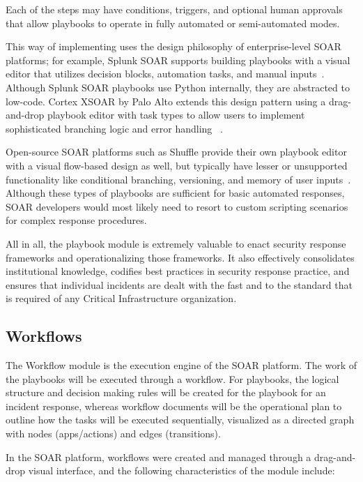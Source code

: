 Each of the steps may have conditions, triggers, and optional human approvals that allow playbooks to operate in fully automated or semi-automated modes.

This way of implementing uses the design philosophy of enterprise-level SOAR platforms; for example, Splunk SOAR supports building playbooks with a visual editor that utilizes decision blocks, automation tasks, and manual inputs~\cite{splunk}. Although Splunk SOAR playbooks use Python internally, they are abstracted to low-code. Cortex XSOAR by Palo Alto extends this design pattern using a drag-and-drop playbook editor with task types to allow users to implement sophisticated branching logic and error handling ~\cite{paloalto}.

Open-source SOAR platforms such as Shuffle provide their own playbook editor with a visual flow-based design as well, but typically have lesser or unsupported functionality like conditional branching, versioning, and memory of user inputs~\cite{techtarget}. Although these types of playbooks are sufficient for basic automated responses, SOAR developers would most likely need to resort to custom scripting scenarios for complex response procedures.

All in all, the playbook module is extremely valuable to enact security response frameworks and operationalizing those frameworks. It also effectively consolidates institutional knowledge, codifies best practices in security response practice, and ensures that individual incidents are dealt with the fast and to the standard that is required of any Critical Infrastructure organization.

\subsection{Workflows}

The Workflow module is the execution engine of the SOAR platform. The work of the playbooks will be executed through a workflow. For playbooks, the logical structure and decision making rules will be created for the playbook for an incident response, whereas workflow documents will be the operational plan to outline how the tasks will be executed sequentially, visualized as a directed graph with nodes (apps/actions) and edges (transitions).

In the SOAR platform, workflows were created and managed through a drag-and-drop visual interface, and the following characteristics of the module include:

